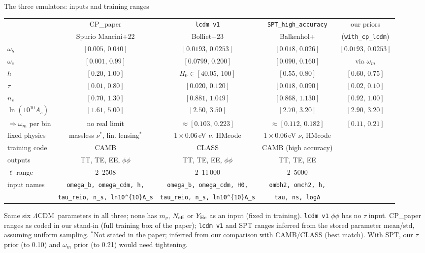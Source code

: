 \documentclass[aspectratio=169,10pt]{beamer}
\newcommand{\om}{\omega_m}
\newcommand{\lcdm}{$\Lambda$CDM}
\begin{document}
\begin{frame}{The three emulators: inputs and training ranges}
\centering\scriptsize
\setlength{\tabcolsep}{3pt}
\renewcommand{\arraystretch}{1.12}
\begin{tabular}{@{}lcccc@{}}
\toprule
& CP\_paper & \texttt{lcdm v1} & \texttt{SPT\_high\_accuracy} & our priors \\
& Spurio Mancini+22 & Bolliet+23 & Balkenhol+ & (\texttt{with\_cp\_lcdm}) \\
\midrule
$\omega_b$ & $[0.005,\,0.040]$ & $[0.0193,\,0.0253]$ & $[0.018,\,0.026]$ & $[0.0193,\,0.0253]$ \\
$\omega_c$ & $[0.001,\,0.99]$ & $[0.0799,\,0.200]$ & $[0.090,\,0.160]$ & via $\om$ \\
$h$ & $[0.20,\,1.00]$ & $H_0\in[40.05,\,100]$ & $[0.55,\,0.80]$ & $[0.60,\,0.75]$ \\
$\tau$ & $[0.01,\,0.80]$ & $[0.020,\,0.120]$ & $[0.018,\,0.090]$ & $[0.02,\,0.10]$ \\
$n_s$ & $[0.70,\,1.30]$ & $[0.881,\,1.049]$ & $[0.868,\,1.130]$ & $[0.92,\,1.00]$ \\
$\ln(10^{10}A_s)$ & $[1.61,\,5.00]$ & $[2.50,\,3.50]$ & $[2.70,\,3.20]$ & $[2.90,\,3.20]$ \\
\addlinespace
$\Rightarrow\om$ per bin & no real limit & $\approx[0.103,\,0.223]$ & $\approx[0.112,\,0.182]$ & $[0.11,\,0.21]$ \\
\midrule
fixed physics & massless $\nu^\ast$, lin. lensing$^\ast$ & $1\times0.06$\,eV $\nu$, HMcode & $1\times0.06$\,eV $\nu$, HMcode & \\
training code & CAMB & CLASS & CAMB (high accuracy) & \\
outputs & TT, TE, EE, $\phi\phi$ & TT, TE, EE, $\phi\phi$ & TT, TE, EE & \\
$\ell$ range & 2--2508 & 2--11\,000 & 2--5000 & \\
input names & \texttt{omega\_b, omega\_cdm, h,} & \texttt{omega\_b, omega\_cdm, H0,} & \texttt{ombh2, omch2, h,} & \\
            & \texttt{tau\_reio, n\_s, ln10\^{}\{10\}A\_s} & \texttt{tau\_reio, n\_s, ln10\^{}\{10\}A\_s} & \texttt{tau, ns, logA} & \\
\bottomrule
\end{tabular}

\vspace{0.5em}
\raggedright
{\tiny Same six \lcdm\ parameters in all three; none has $m_\nu$, $N_{\rm eff}$ or $Y_{\rm He}$ as an input (fixed in training). \texttt{lcdm v1} $\phi\phi$ has no $\tau$ input.
CP\_paper ranges as coded in our stand-in (full training box of the paper); \texttt{lcdm v1} and SPT ranges inferred from the stored parameter mean/std, assuming uniform sampling.
$^\ast$Not stated in the paper; inferred from our comparison with CAMB/CLASS (best match). With SPT, our $\tau$ prior (to 0.10) and $\om$ prior (to 0.21) would need tightening.\par}
\end{frame}
\end{document}

